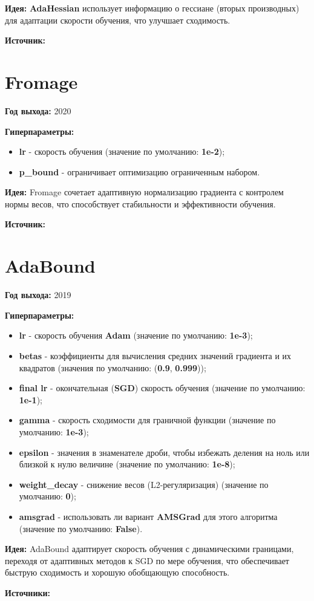 \documentclass{article}
\begin{document}
\textbf{Идея:} \textbf{AdaHessian} использует информацию о гессиане (вторых производных) для адаптации скорости обучения, что улучшает сходимость.

\textbf{Источник:} \cite{adahessian}

\section{\textbf{Fromage}}

\textbf{Год выхода:} 2020

\textbf{Гиперпараметры:}

\begin{itemize}
    \item \textbf{lr} - скорость обучения (значение по умолчанию: \textbf{1e-2});
    \item \textbf{p\_bound} - ограничивает оптимизацию ограниченным набором.
\end{itemize}

\textbf{Идея:} Fromage сочетает адаптивную нормализацию градиента с контролем нормы весов, что способствует стабильности и эффективности обучения.

\textbf{Источник:} \cite{fromage}

\section{\textbf{AdaBound}}

\textbf{Год выхода:} 2019

\textbf{Гиперпараметры:}

\begin{itemize}
    \item \textbf{lr} - скорость обучения \textbf{Adam} (значение по умолчанию: \textbf{1e-3});
    \item \textbf{betas} - коэффициенты для вычисления средних значений градиента и их квадратов (значения по умолчанию: (\textbf{0.9}, \textbf{0.999}));
    \item \textbf{final lr} - окончательная (\textbf{SGD}) скорость обучения (значение по умолчанию: \textbf{1e-1});
    \item \textbf{gamma} - скорость сходимости для граничной функции (значение по умолчанию: \textbf{1e-3});
    \item \textbf{epsilon} - значения в знаменателе дроби, чтобы избежать деления на ноль или близкой к нулю величине (значение по умолчанию: \textbf{1e-8});
    \item \textbf{weight\_decay} - снижение весов (L2-регуляризация) (значение по умолчанию: \textbf{0});
    \item \textbf{amsgrad} - использовать ли вариант \textbf{AMSGrad} для этого алгоритма (значение по умолчанию: \textbf{False}).
\end{itemize}

\textbf{Идея:} AdaBound адаптирует скорость обучения с динамическими границами, переходя от адаптивных методов к SGD по мере обучения, что обеспечивает быструю сходимость и хорошую обобщающую способность.

\textbf{Источники:} \cite{adabound}

\printbibliography
\end{document}

